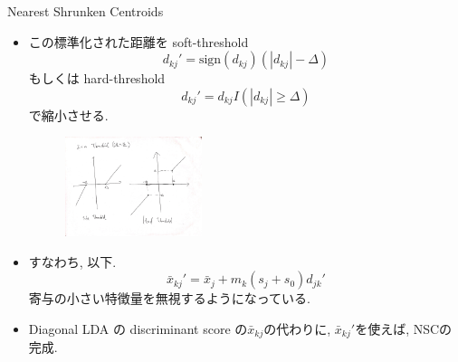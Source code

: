 \documentclass[dvipdfmx,8pt]{beamer}
\begin{document}
  \begin{frame}{Nearest Shrunken Centroids}
    \begin{itemize}
      \item この標準化された距離を soft-threshold
        \[
          d_{kj}'=\mathrm{sign}(d_{kj})(|d_{kj}|-\Delta)
        \]
        もしくは hard-threshold
        \[
          d_{kj}'=d_{kj}I(|d_{kj}|\ge\Delta)
        \]
        で縮小させる.
        \begin{figure}[htb]
          \centering
          \includegraphics[width=4cm]{./images/thresholds.jpg}
        \end{figure}
      \item すなわち, 以下.
        \[
          \bar{x}_{kj}'=\bar{x}_j+m_k(s_j+s_0)d_{jk}'
        \]
        寄与の小さい特徴量を無視するようになっている.
      \item Diagonal LDA の discriminant score の$\bar{x}_{kj}$の代わりに, $\bar{x}_{kj}'$を使えば, NSCの完成.
    \end{itemize}
  \end{frame}
\end{document}
